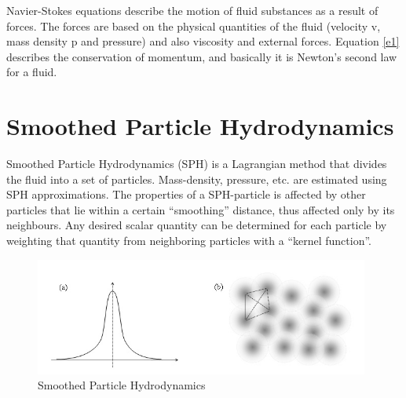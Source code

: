 \documentclass[a4paper,12pt,twoside,final]{report}
\begin{document}
\noindent Navier-Stokes equations describe the motion of fluid substances as a result of forces. The forces are based on the physical quantities of the fluid (velocity v, mass density p and pressure) and also viscosity and external forces. Equation \ref{e1} describes the conservation of momentum, and basically it is Newton’s second law for a fluid.\\


\section{Smoothed Particle Hydrodynamics}
Smoothed Particle Hydrodynamics (SPH) is a Lagrangian method that divides the fluid into a set of particles. Mass-density, pressure, etc. are estimated using SPH approximations. The properties of a SPH-particle is affected by other particles that lie within a certain “smoothing” distance, thus affected only by its neighbours. Any desired scalar quantity can be determined for each particle by weighting that quantity from neighboring particles with a “kernel function”. \\

\begin{figure}[h]
\begin{center}
    \includegraphics[width=11cm]{figs/sph.jpg} 
\end{center}
\caption{Smoothed Particle Hydrodynamics}
\label{model_block}
\end{figure}
\end{document}
